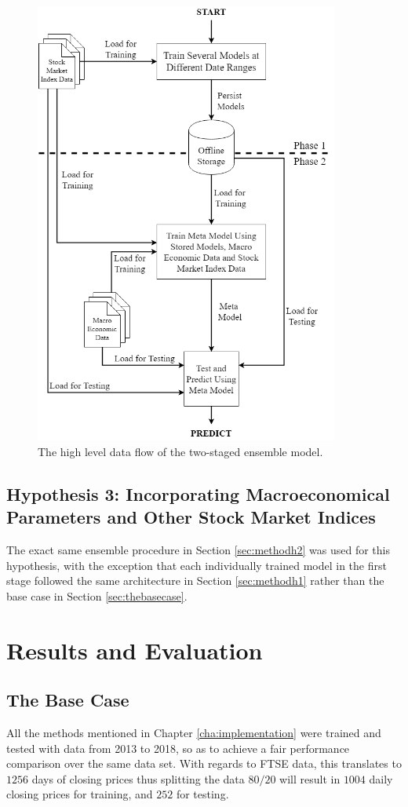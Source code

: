 \documentclass{UoYCSproject}
\begin{document}
\begin{figure}[h]
\includegraphics[width=10cm]{Meta-model.png}
\centering
\caption{The high level data flow of the two-staged ensemble model.} 
\label{fig:metamodelflow}
\end{figure}


\section{Hypothesis 3: Incorporating Macroeconomical Parameters and Other Stock Market Indices}
\label{sec:methodh3}
The exact same ensemble procedure in Section \ref{sec:methodh2} was used for this hypothesis, with the exception that each individually trained model in the first stage followed the same architecture in Section \ref{sec:methodh1} rather than the base case in Section \ref{sec:thebasecase}. 


\chapter{Results and Evaluation}
\label{cha:resultsandevaluation}
\section{The Base Case}
All the methods mentioned in Chapter \ref{cha:implementation} were trained and tested with data from 2013 to 2018, so as to achieve a fair performance comparison over the same data set. With regards to FTSE data, this translates to $1256$ days of closing prices thus splitting the data $80/20$ will result in $1004$ daily closing prices for training, and $252$ for testing.
\end{document}
